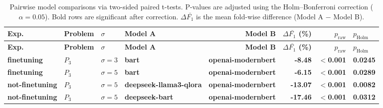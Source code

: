 \begin{longtable}{llllrrrl}
\caption{Pairwise model comparisons via two-sided paired t-tests. P-values are adjusted using the Holm--Bonferroni correction ($\alpha = 0.05$). Bold rows are significant after correction. $\Delta\bar{F_1}$ is the mean fold-wise difference (Model A $-$ Model B).} \label{tab:holm_ttests} \\
\hline
\textbf{Exp.} & \textbf{Problem} & \textbf{$\sigma$} & \textbf{Model A} & \textbf{Model B} & \textbf{$\Delta \bar{F_1}$ (\%)} & \textbf{$p_\text{raw}$} & \textbf{$p_\text{Holm}$} \\
\hline
\endfirsthead
\hline
\textbf{Exp.} & \textbf{Problem} & \textbf{$\sigma$} & \textbf{Model A} & \textbf{Model B} & \textbf{$\Delta \bar{F_1}$ (\%)} & \textbf{$p_\text{raw}$} & \textbf{$p_\text{Holm}$} \\
\hline
\endhead
\hline
\endfoot
\textbf{finetuning} & \textbf{$P_3$} & \textbf{$\sigma{=}3$} & \textbf{bart} & \textbf{openai-modernbert} & \textbf{-8.48} & \textbf{$<$0.001} & \textbf{0.0245} \\
\hline
\textbf{finetuning} & \textbf{$P_3$} & \textbf{$\sigma{=}5$} & \textbf{bart} & \textbf{openai-modernbert} & \textbf{-6.15} & \textbf{$<$0.001} & \textbf{0.0289} \\
\hline
\textbf{not-finetuning} & \textbf{$P_3$} & \textbf{$\sigma{=}5$} & \textbf{deepseek-llama3-qlora} & \textbf{openai-modernbert} & \textbf{-13.07} & \textbf{$<$0.001} & \textbf{0.0082} \\
\textbf{not-finetuning} & \textbf{$P_3$} & \textbf{$\sigma{=}5$} & \textbf{deepseek-bart} & \textbf{openai-modernbert} & \textbf{-17.46} & \textbf{$<$0.001} & \textbf{0.0312} \\
\hline
\end{longtable}
